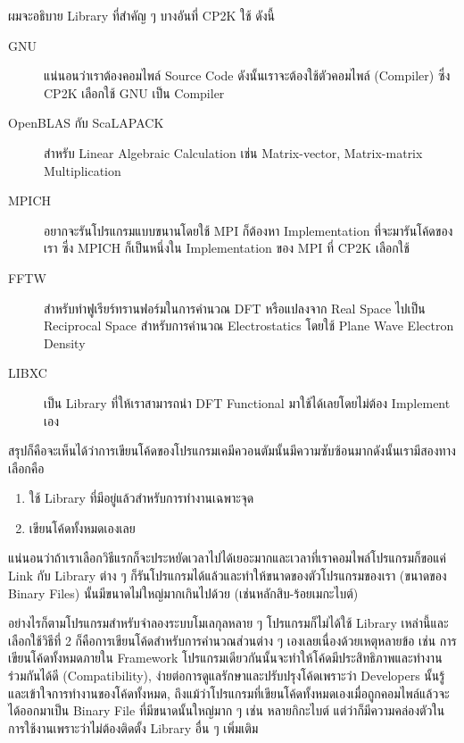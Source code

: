 ผมจะอธิบาย Library ที่สำคัญ ๆ บางอันที่ CP2K ใช้ ดังนี้
%
\begin{description}
  \item[GNU] แน่นอนว่าเราต้องคอมไพล์ Source Code ดังนั้นเราจะต้องใช้ตัวคอมไพล์ (Compiler) ซึ่ง CP2K เลือกใช้ GNU เป็น Compiler

  \item[OpenBLAS กับ ScaLAPACK]  สำหรับ Linear Algebraic Calculation เช่น Matrix-vector, Matrix-matrix Multiplication

  \item[MPICH] อยากจะรันโปรแกรมแบบขนานโดยใช้ MPI ก็ต้องหา Implementation ที่จะมารันโค้ดของเรา ซึ่ง MPICH ก็เป็นหนึ่งใน Implementation ของ MPI ที่ CP2K เลือกใช้

  \item[FFTW] สำหรับทำฟูเรียร์ทรานฟอร์มในการคำนวณ DFT หรือแปลงจาก Real Space ไปเป็น Reciprocal Space สำหรับการคำนวณ Electrostatics โดยใช้ Plane Wave Electron Density

  \item[LIBXC] เป็น Library ที่ให้เราสามารถนำ DFT Functional มาใช้ได้เลยโดยไม่ต้อง Implement เอง
\end{description}

สรุปก็คือจะเห็นได้ว่าการเขียนโค้ดของโปรแกรมเคมีควอนตัมนั้นมีความซับซ้อนมากดังนั้นเรามีสองทางเลือกคือ
%
\begin{enumerate}[topsep=0pt,noitemsep]
  \setlength\itemsep{0.5em}
  \item ใช้ Library ที่มีอยู่แล้วสำหรับการทำงานเฉพาะจุด

  \item เขียนโค้ดทั้งหมดเองเลย
\end{enumerate}

แน่นอนว่าถ้าเราเลือกวิธีแรกก็จะประหยัดเวลาไปได้เยอะมากและเวลาที่เราคอมไพล์โปรแกรมก็ขอแค่ Link กับ Library ต่าง ๆ ก็รันโปรแกรมได้แล้วและทำให้ขนาดของตัวโปรแกรมของเรา (ขนาดของ Binary Files) นั้นมีขนาดไม่ใหญ่มากเกินไปด้วย (เช่นหลักสิบ-ร้อยเมกะไบต์)

อย่างไรก็ตามโปรแกรมสำหรับจำลองระบบโมเลกุลหลาย ๆ โปรแกรมก็ไม่ได้ใช้ Library เหล่านี้และเลือกใช้วิธีที่ 2 ก็คือการเขียนโค้ดสำหรับการคำนวณส่วนต่าง ๆ เองเลยเนื่องด้วยเหตุหลายข้อ เช่น การเขียนโค้ดทั้งหมดภายใน Framework โปรแกรมเดียวกันนั้นจะทำให้โค้ดมีประสิทธิภาพและทำงานร่วมกันได้ดี (Compatibility), ง่ายต่อการดูแลรักษาและปรับปรุงโค้ดเพราะว่า Developers นั้นรู้และเข้าใจการทำงานของโค้ดทั้งหมด, ถึงแม้ว่าโปรแกรมที่เขียนโค้ดทั้งหมดเองเมื่อถูกคอมไพล์แล้วจะได้ออกมาเป็น Binary File ที่มีขนาดนั้นใหญ่มาก ๆ เช่น หลายกิกะไบต์ แต่ว่าก็มีความคล่องตัวในการใช้งานเพราะว่าไม่ต้องติดตั้ง Library อื่น ๆ เพิ่มเติม

